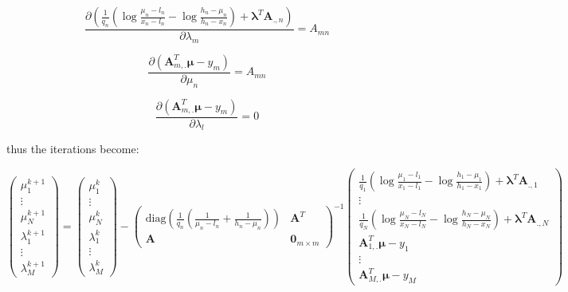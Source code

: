 \documentclass{tex/note}
\begin{document}
\begin{equation*}
\frac{\partial \left( \frac{1}{q_n} \left( \log \frac{\mu_n - l_n}{x_n - l_n} - \log \frac{h_n - \mu_n}{h_n - x_n} \right) + \bm{\lambda}^T \bm{A}_{.,n} \right)}{\partial \lambda_m} = A_{mn}
\end{equation*}

\begin{equation*}
\frac{\partial \left( \bm{A}_{m,.}^T \bm{\mu} - y_m \right)}{\partial \mu_n} = A_{mn}
\end{equation*}

\begin{equation*}
\frac{\partial \left( \bm{A}_{m,.}^T \bm{\mu} - y_m \right)}{\partial \lambda_l} = 0
\end{equation*}

thus the iterations become:

\begin{equation*}
\begin{pmatrix} \mu_1^{k + 1} \\ \vdots \\ \mu_N^{k + 1} \\ \lambda_1^{k + 1} \\ \vdots \\ \lambda_M^{k + 1} \end{pmatrix} = \begin{pmatrix} \mu_1^k \\ \vdots \\ \mu_N^k \\ \lambda_1^k \\ \vdots \\ \lambda_M^k \end{pmatrix} - \begin{pmatrix} \text{diag} \left( \frac{1}{q_n} \left( \frac{1}{\mu_n - l_n} + \frac{1}{h_n - \mu_n} \right) \right) & \bm{A}^T \\ \bm{A} & \bm{0}_{m \times m} \end{pmatrix} ^{-1} \begin{pmatrix} \frac{1}{q_1} \left( \log \frac{\mu_1 - l_1}{x_1 - l_1} - \log \frac{h_1 - \mu_1}{h_1 - x_1} \right) + \bm{\lambda}^T \bm{A}_{.,1} \\ \vdots \\ \frac{1}{q_N} \left( \log \frac{\mu_N - l_N}{x_N - l_N} - \log \frac{h_N - \mu_N}{h_N - x_N} \right) + \bm{\lambda}^T \bm{A}_{.,N} \\ \bm{A}_{1,.}^T \bm{\mu} - y_1 \\ \vdots \\ \bm{A}_{M,.}^T \bm{\mu} - y_M \end{pmatrix}
\end{equation*}
\end{document}
